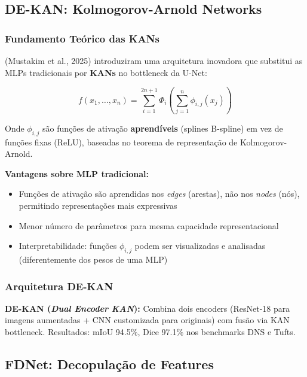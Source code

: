 \subsection{DE-KAN: Kolmogorov-Arnold Networks}

\subsubsection{Fundamento Teórico das KANs}

 (Mustakim et al., 2025) introduziram uma arquitetura
inovadora que substitui as MLPs tradicionais por \textbf{KANs} no bottleneck
da U-Net:

\begin{equation}
  f(x_1, \ldots, x_n) = \sum_{i=1}^{2n+1} \Phi_i\left(\sum_{j=1}^{n} \phi_{i,j}(x_j)\right)
  \label{eq:kan}
\end{equation}

Onde $\phi_{i,j}$ são funções de ativação \textbf{aprendíveis} (splines B-spline)
em vez de funções fixas (ReLU), baseadas no teorema de representação de
Kolmogorov-Arnold.

\textbf{Vantagens sobre MLP tradicional:}
\begin{itemize}
  \item Funções de ativação são aprendidas nos \textit{edges} (arestas), não nos
        \textit{nodes} (nós), permitindo representações mais expressivas
  \item Menor número de parâmetros para mesma capacidade representacional
  \item Interpretabilidade: funções $\phi_{i,j}$ podem ser visualizadas e
        analisadas (diferentemente dos pesos de uma MLP)
\end{itemize}

\subsubsection{Arquitetura DE-KAN}

\textbf{DE-KAN (\textit{Dual Encoder KAN}):} Combina dois encoders (ResNet-18
para imagens aumentadas + CNN customizada para originais) com fusão via KAN
bottleneck. Resultados: mIoU 94.5\%, Dice 97.1\% nos benchmarks DNS e Tufts.

\subsection{FDNet: Decopulação de Features}

